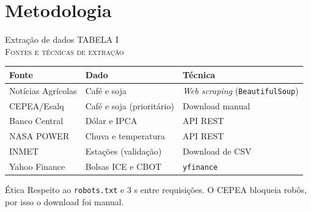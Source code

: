 \documentclass{beamer}
\begin{document}
\section{Metodologia}

\begin{frame}{Extração de dados}
    \centering
    \footnotesize
    TABELA I\\ \textsc{Fontes e técnicas de extração}\\[0.1cm]
    \begin{tabular}{@{}lll@{}}
        \toprule
        Fonte & Dado & Técnica \\
        \midrule
        Notícias Agrícolas & Café e soja & \textit{Web scraping} (\texttt{BeautifulSoup}) \\
        CEPEA/Esalq & Café e soja (prioritário) & Download manual \\
        Banco Central & Dólar e IPCA & API REST \\
        NASA POWER & Chuva e temperatura & API REST \\
        INMET & Estações (validação) & Download de CSV \\
        Yahoo Finance & Bolsas ICE e CBOT & \texttt{yfinance} \\
        \bottomrule
    \end{tabular}

    \vspace{0.2cm}
    \raggedright
    \begin{alertblock}{Ética}
        Respeito ao \texttt{robots.txt} e 3 s entre requisições. O CEPEA bloqueia robôs, por isso o download foi manual.
    \end{alertblock}
\end{frame}
\end{document}
